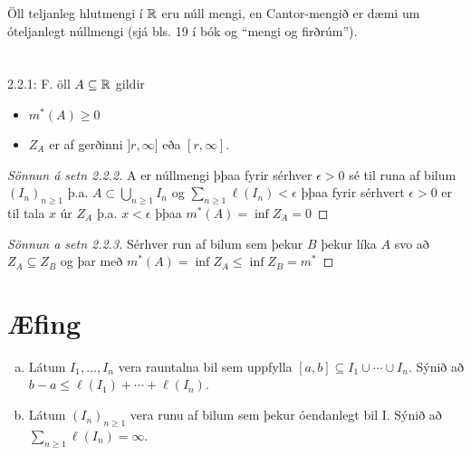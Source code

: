 \documentclass[12pt]{book}
\begin{document}
\begin{daemi}

Öll teljanleg hlutmengi í $\mathbb{R}$ eru núll mengi, en Cantor-mengið er dæmi um óteljanlegt núllmengi (sjá bls. 19 í bók og ``mengi og firðrúm'').
\end{daemi}


\section{}
\begin{ath}2.2.1:
F. öll $A \subseteq \mathbb{R}$ gildir
\begin{itemize}
\item $m^*(A) \geq 0$
  
\item $Z_A$ er af gerðinni $]r, \infty]$ eða $[r,\infty]$.
\end{itemize}
\end{ath}
\begin{proof}[Sönnun á setn 2.2.2]
A er núllmengi þþaa fyrir sérhver $\epsilon > 0$ sé til runa af bilum $(I_n)_{n \geq 1}$ þ.a. $A \subset \bigcup_{n \geq 1} I_n$ og $\sum_{n \geq 1} \ell(I_n) < \epsilon$ þþaa
fyrir sérhvert $\epsilon > 0$ er til tala $x$ úr $Z_A$ þ.a. $x < \epsilon$ þþaa $m^*(A) = \inf{Z_A} = 0$
\end{proof}

\begin{proof}[Sönnun a setn 2.2.3] Sérhver run af bilum sem þekur $B$ þekur líka $A$ svo að $Z_A \subseteq Z_B$ og þar með $m^{*}(A) = \inf{Z_A} \leq \inf{Z_B} = m^{*}$
\end{proof}

\section*{Æfing}
\begin{enumerate}[(a)]
    \item Látum $I_1, \dotsc, I_n$ vera rauntalna bil sem uppfylla $[a,b] \subseteq I_1 \cup \dotsb \cup I_n$. Sýnið að $b - a \leq \ell(I_1) + \dotsb + \ell(I_n)$.
    \item Látum $(I_n)_{n \geq 1}$ vera runu af bilum sem þekur óendanlegt bil I. Sýnið að $\sum_{n \geq 1} \ell(I_n) = \infty$.
\end{enumerate}
\end{document}
